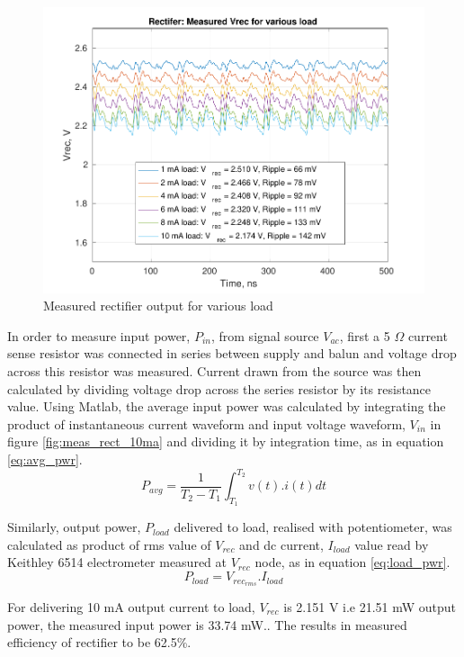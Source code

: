 \documentclass[12pt,a4paper,UKenglish]{report}
\begin{document}
\begin{figure} [!htbp]
  \centering
  \includegraphics[width=\textwidth]{img/meas/rect_load_sweep.pdf} 
 \caption{Measured rectifier output for various load} 
\label{fig:meas_rect_load_sweep} 
\end{figure}

In order to measure input power, $P_{in}$, from signal source $V_{ac}$, first a 5 $\Omega $ current sense resistor was connected in series between supply and balun and voltage drop across this 
 resistor was measured. Current drawn from the source was then calculated by dividing voltage drop across the series resistor by its resistance value.
 Using Matlab, the average input power was calculated by integrating the product of instantaneous current waveform and input voltage waveform, $V_{in}$  in figure \ref{fig:meas_rect_10ma} and dividing 
 it by integration time, as in equation \ref{eq:avg_pwr}.
 \begin{equation} \label{eq:avg_pwr} 
P_{avg} = \frac{1}{T_{2}-T_{1}}\int_{T_{1}}^{T_{2}} v(t).i(t) dt
\end{equation}

Similarly, output power, $P_{load}$ delivered to load, realised with potentiometer, was calculated as product of rms value of $V_{rec}$ 
and dc current, $I_{load}$ value read by Keithley 6514 electrometer measured at $V_{rec}$ node, as in equation \ref{eq:load_pwr}.
\begin{equation} \label{eq:load_pwr} 
P_{load} = V_{rec_{rms}}.I_{load}
\end{equation}

For delivering 10 mA output current to load,  $V_{rec}$ is 2.151 V i.e 21.51 mW output power, the measured input power is 33.74 mW.. The results 
in measured efficiency of rectifier to be 62.5\%.
\end{document}
